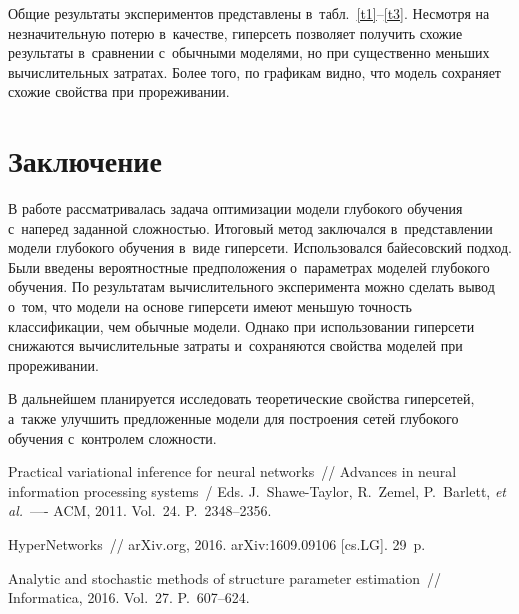 \begin{multicols}{2}
Общие результаты экспериментов представлены 
в~табл.~\ref{t1}--\ref{t3}. Несмотря на незначительную потерю 
в~качестве, гиперсеть позволяет получить схожие результаты в~сравнении с~обычными 
моделями, но при существенно меньших вычислительных затратах. Более того, по 
графикам видно, что модель сохраняет схожие свойства при прореживании.

\vspace*{-3pt}

\section{Заключение}

\vspace*{-3pt}

В работе рассматривалась задача оптимизации модели глубокого обучения с~наперед 
заданной слож\-ностью. Итоговый метод заключался в~представлении модели глубокого 
обучения в~виде гиперсети. Использовался байесовский подход. Были введены 
вероятностные предположения о~па\-ра\-мет\-рах моделей глубокого обучения. По 
результатам вычислительного эксперимента можно сделать вывод о~том, что модели 
на основе гиперсети имеют меньшую точность классификации, чем обычные модели. 
Однако при использовании гиперсети снижаются вычислительные затраты 
и~сохраняются свойства моделей при прореживании.

В дальнейшем планируется исследовать теоретические свойства гиперсетей, а~также 
улучшить предложенные модели для построения сетей глубокого обучения с~контролем 
слож\-ности.

\vspace*{-6pt}

{\small\frenchspacing
{%
\begin{thebibliography}{9}
    Practical variational inference for neural 
networks~// Advances in neural information processing systems~/
Eds. J.~Shawe-Taylor, R.~Zemel, P.~Barlett, \textit{et al.}~----
ACM, 2011. Vol.~24. P.~2348--2356.
    
   HyperNetworks~// arXiv.org, 
2016.    arXiv:1609.09106 [cs.LG]. 29~p.
    
    Analytic 
and stochastic methods of structure parameter estimation~// Informatica, 2016.  
Vol.~27. P.~607--624.
    

\end{thebibliography}}}
\end{multicols}
